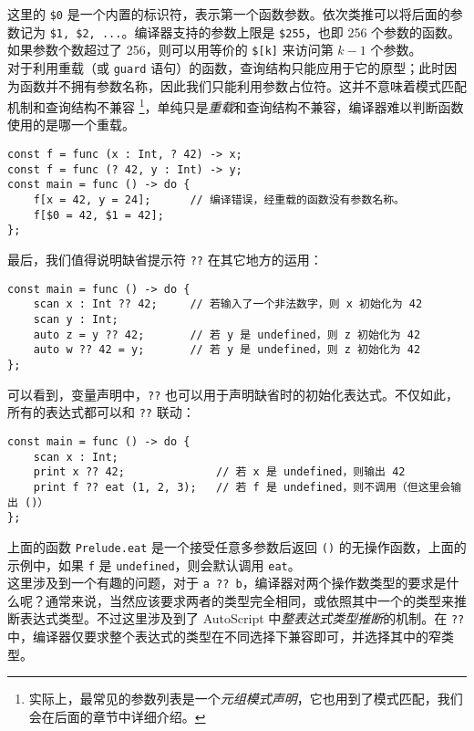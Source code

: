 这里的 \texttt{\$0} 是一个内置的标识符，表示第一个函数参数。依次类推可以将后面的参数记为 \texttt{\$1, \$2, ...}。编译器支持的参数上限是 \texttt{\$255}，也即 256 个参数的函数。如果参数个数超过了 256，则可以用等价的 \texttt{\$[k]} 来访问第 $k-1$ 个参数。 \\

对于利用重载（或 \lstinline!guard! 语句）的函数，查询结构只能应用于它的原型；此时因为函数并不拥有参数名称，因此我们只能利用参数占位符。这并不意味着模式匹配机制和查询结构不兼容 \footnote{实际上，最常见的参数列表是一个\emph{元组模式声明}，它也用到了模式匹配，我们会在后面的章节中详细介绍。}，单纯只是\emph{重载}和查询结构不兼容，编译器难以判断函数使用的是哪一个重载。

\begin{lstlisting}
const f = func (x : Int, ? 42) -> x;
const f = func (? 42, y : Int) -> y;
const main = func () -> do {
	f[x = 42, y = 24];		// 编译错误，经重载的函数没有参数名称。
	f[$0 = 42, $1 = 42];
};
\end{lstlisting}

最后，我们值得说明缺省提示符 \lstinline!??! 在其它地方的运用：

\begin{lstlisting}
const main = func () -> do {
	scan x : Int ?? 42;		// 若输入了一个非法数字，则 x 初始化为 42
	scan y : Int;
	auto z = y ?? 42;		// 若 y 是 undefined，则 z 初始化为 42
	auto w ?? 42 = y;		// 若 y 是 undefined，则 z 初始化为 42
};
\end{lstlisting}

可以看到，变量声明中，\lstinline!??! 也可以用于声明缺省时的初始化表达式。不仅如此，所有的表达式都可以和 \lstinline!??! 联动：

\begin{lstlisting}
const main = func () -> do {
	scan x : Int;
	print x ?? 42;				// 若 x 是 undefined，则输出 42
	print f ?? eat (1, 2, 3);	// 若 f 是 undefined，则不调用（但这里会输出 ()）
};
\end{lstlisting}

上面的函数 \lstinline!Prelude.eat! 是一个接受任意多参数后返回 \lstinline!()! 的无操作函数，上面的示例中，如果 \lstinline!f! 是 \lstinline!undefined!，则会默认调用 \lstinline!eat!。 \\

这里涉及到一个有趣的问题，对于 \lstinline!a ?? b!，编译器对两个操作数类型的要求是什么呢？通常来说，当然应该要求两者的类型完全相同，或依照其中一个的类型来推断表达式类型。不过这里涉及到了 AutoScript 中\emph{整表达式类型推断}的机制。在 \lstinline!??! 中，编译器仅要求整个表达式的类型在不同选择下兼容即可，并选择其中的窄类型。

